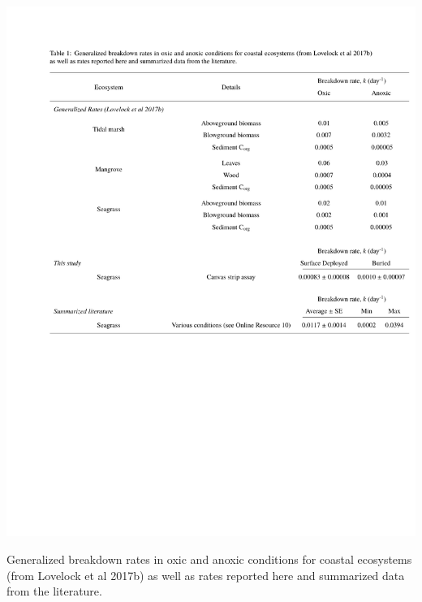 \begin{table}[t]
  \centering
  \includegraphics[width=.97\textwidth,clip, trim={2.5cm 10.0cm 0.3cm 3.2cm}]{Figures/chapter2/Tsummary}
\caption[Generalized breakdown rates in oxic and anoxic conditions for coastal ecosystems (from Lovelock et al 2017b) as well as rates reported here and summarized data from the literature.]{Generalized breakdown rates in oxic and anoxic conditions for coastal ecosystems (from Lovelock et al 2017b) as well as rates reported here and summarized data from the literature.}
  \label{table:2T6}
\end{table}

